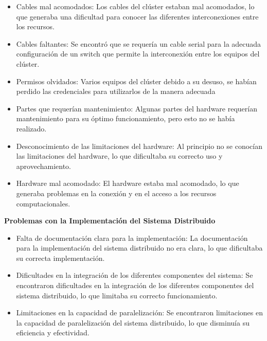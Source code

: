 \begin{spacing}{1.5}
  \begin{itemize}
    \item Cables mal acomodados: Los cables del clúster estaban mal
          acomodados, lo que generaba una dificultad para conocer las
          diferentes
          interconexiones entre los recursos.
    \item Cables faltantes: Se encontró que se requería un cable serial
          para la adecuada configuración de un switch que permite la
          interconexión entre
          los equipos del clúster.
    \item Permisos olvidados: Varios equipos del clúster debido a su
          desuso, se habían perdido las credenciales para utilizarlos de la
          manera
          adecuada
    \item Partes que requerían mantenimiento: Algunas partes del hardware
          requerían mantenimiento para su óptimo funcionamiento, pero esto no
          se había
          realizado.
    \item Desconocimiento de las limitaciones del hardware: Al principio no
          se conocían las limitaciones del hardware, lo que dificultaba su
          correcto uso y
          aprovechamiento.
    \item Hardware mal acomodado: El hardware estaba mal acomodado, lo que
          generaba problemas en la conexión y en el acceso a los recursos
          computacionales.
  \end{itemize}

  \textbf{Problemas con la Implementación del Sistema Distribuido}

  \begin{itemize}
    \item Falta de documentación clara para la implementación: La
          documentación para la implementación del sistema distribuido no era
          clara, lo
          que dificultaba su correcta implementación.
    \item Dificultades en la integración de los diferentes componentes del
          sistema: Se encontraron dificultades en la integración de los
          diferentes
          componentes del sistema distribuido, lo que limitaba su correcto
          funcionamiento.
    \item Limitaciones en la capacidad de paralelización: Se encontraron
          limitaciones en la capacidad de paralelización del sistema
          distribuido, lo que
          disminuía su eficiencia y efectividad.
  \end{itemize}


\end{spacing}
